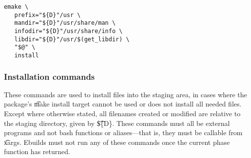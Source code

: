 \begin{description}
\begin{lstlisting}[caption=einstall command,label=lst:einstall]
emake \
   prefix="${D}"/usr \
   mandir="${D}"/usr/share/man \
   infodir="${D}"/usr/share/info \
   libdir="${D}"/usr/$(get_libdir) \
   "$@" \
   install
\end{lstlisting}

\end{description}

\subsubsection{Installation commands}
These commands are used to install files into the staging area, in cases where the package's \t{make
install} target cannot be used or does not install all needed files. Except where otherwise stated,
all filenames created or modified are relative to the staging directory, given by \t{\$\{D\}}. These
commands must all be external programs and not bash functions or aliases---that is, they must be
callable from \t{xargs}. Ebuilds must not run any of these commands once the current phase function
has returned.

